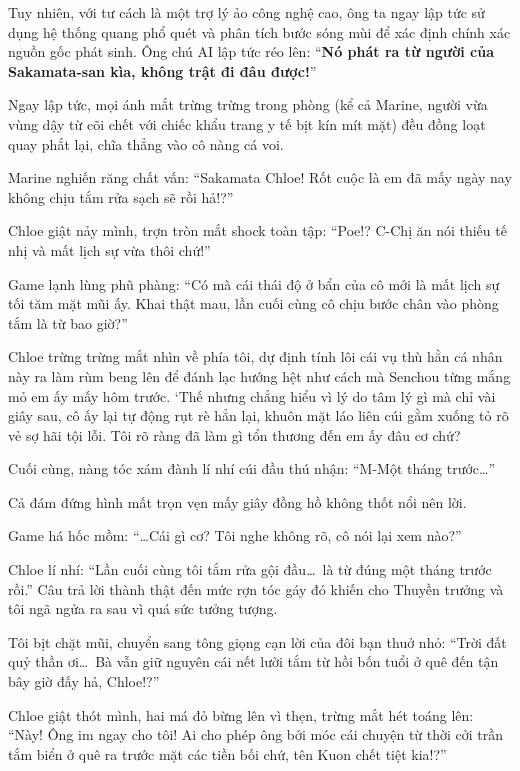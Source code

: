 \documentclass[../main.tex]{subfiles}
\begin{document}
Tuy nhiên, với tư cách là một trợ lý ảo công nghệ cao, ông ta ngay lập tức sử dụng hệ thống quang phổ quét và phân tích bước sóng mùi để xác định chính xác nguồn gốc phát sinh. Ông chú AI lập tức réo lên: ``\textbf{Nó phát ra từ người của Sakamata-san kìa, không trật đi đâu được!}''

Ngay lập tức, mọi ánh mắt trừng trừng trong phòng (kể cả Marine, người vừa vùng dậy từ cõi chết với chiếc khẩu trang y tế bịt kín mít mặt) đều đồng loạt quay phắt lại, chĩa thẳng vào cô nàng cá voi.

Marine nghiến răng chất vấn: ``Sakamata Chloe! Rốt cuộc là em đã mấy ngày nay không chịu tắm rửa sạch sẽ rồi hả!?''

Chloe giật nảy mình, trợn tròn mắt shock toàn tập: ``Poe!? C-Chị ăn nói thiếu tế nhị và mất lịch sự vừa thôi chứ!''

Game lạnh lùng phũ phàng: ``Có mà cái thái độ ở bẩn của cô mới là mất lịch sự tối tăm mặt mũi ấy. Khai thật mau, lần cuối cùng cô chịu bước chân vào phòng tắm là từ bao giờ?''

Chloe trừng trừng mắt nhìn về phía tôi, dự định tính lôi cái vụ thù hằn cá nhân này ra làm rùm beng lên để đánh lạc hướng hệt như cách mà Senchou từng mắng mỏ em ấy mấy hôm trước. `Thế nhưng chẳng hiểu vì lý do tâm lý gì mà chỉ vài giây sau, cô ấy lại tự động rụt rè hẳn lại, khuôn mặt láo liên cúi gằm xuống tỏ rõ vẻ sợ hãi tội lỗi. Tôi rõ ràng đã làm gì tổn thương đến em ấy đâu cơ chứ?

Cuối cùng, nàng tóc xám đành lí nhí cúi đầu thú nhận: ``M-Một tháng trước\dots''

Cả đám đứng hình mất trọn vẹn mấy giây đồng hồ không thốt nổi nên lời.

Game há hốc mồm: ``\dots Cái gì cơ? Tôi nghe không rõ, cô nói lại xem nào?''

Chloe lí nhí: ``Lần cuối cùng tôi tắm rửa gội đầu\dots\ là từ đúng một tháng trước rồi.'' Câu trả lời thành thật đến mức rợn tóc gáy đó khiến cho Thuyền trưởng và tôi ngã ngửa ra sau vì quá sức tưởng tượng.

Tôi bịt chặt mũi, chuyển sang tông giọng cạn lời của đôi bạn thuở nhỏ: ``Trời đất quỷ thần ơi\dots\ Bà vẫn giữ nguyên cái nết lười tắm từ hồi bốn tuổi ở quê đến tận bây giờ đấy hả, Chloe!?''

Chloe giật thót mình, hai má đỏ bừng lên vì thẹn, trừng mắt hét toáng lên: ``Này! Ông im ngay cho tôi! Ai cho phép ông bới móc cái chuyện từ thời cởi trần tắm biển ở quê ra trước mặt các tiền bối chứ, tên Kuon chết tiệt kia!?''
\end{document}
